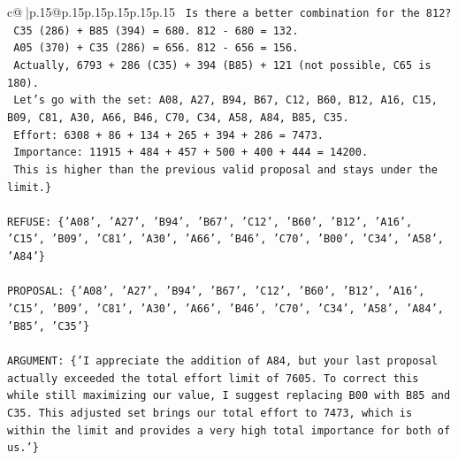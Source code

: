 \documentclass{article}
\begin{document}
{\begin{supertabular}{c@{$\;$}|p{.15\linewidth}@{}p{.15\linewidth}p{.15\linewidth}p{.15\linewidth}p{.15\linewidth}p{.15\linewidth}}
{{{\texttt{    Is there a better combination for the 812?} \\
\texttt{    C35 (286) + B85 (394) = 680. 812 {-} 680 = 132.} \\
\texttt{    A05 (370) + C35 (286) = 656. 812 {-} 656 = 156.} \\
\texttt{    Actually, 6793 + 286 (C35) + 394 (B85) + 121 (not possible, C65 is 180).} \\
\texttt{    Let's go with the set: A08, A27, B94, B67, C12, B60, B12, A16, C15, B09, C81, A30, A66, B46, C70, C34, A58, A84, B85, C35.} \\
\texttt{    Effort: 6308 + 86 + 134 + 265 + 394 + 286 = 7473.} \\
\texttt{    Importance: 11915 + 484 + 457 + 500 + 400 + 444 = 14200.} \\
\texttt{    This is higher than the previous valid proposal and stays under the limit.\}} \\
\\ 
\texttt{REFUSE: \{'A08', 'A27', 'B94', 'B67', 'C12', 'B60', 'B12', 'A16', 'C15', 'B09', 'C81', 'A30', 'A66', 'B46', 'C70', 'B00', 'C34', 'A58', 'A84'\}} \\
\\ 
\texttt{PROPOSAL: \{'A08', 'A27', 'B94', 'B67', 'C12', 'B60', 'B12', 'A16', 'C15', 'B09', 'C81', 'A30', 'A66', 'B46', 'C70', 'C34', 'A58', 'A84', 'B85', 'C35'\}} \\
\\ 
\texttt{ARGUMENT: \{'I appreciate the addition of A84, but your last proposal actually exceeded the total effort limit of 7605. To correct this while still maximizing our value, I suggest replacing B00 with B85 and C35. This adjusted set brings our total effort to 7473, which is within the limit and provides a very high total importance for both of us.'\}} \\
            }
        }
    }
     \\ \\


\end{supertabular}}
\end{document}
